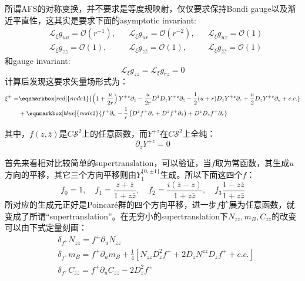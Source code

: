 所谓AFS的对称变换，并不要求是等度规映射，仅仅要求保持Bondi gauge以及渐近平直性，这其实是要求下面的asymptotic invariant:
\begin{align*}
	&\mathcal{L}_\xi g_{uu}=\mathcal{O}(r^{-1}),&&\mathcal{L}_\xi g_{ur}=\mathcal{O}(r^{-2}),&&\mathcal{L}_\xi g_{uz}=\mathcal{O}(1)\\
	&\mathcal{L}_\xi g_{zz}=\mathcal{O}(1),&&\mathcal{L}_\xi g_{z\bar z}=\mathcal{O}(1),&&\mathcal{L}_\xi g_{\bar z \bar z}=\mathcal{O}(1)
\end{align*}
和gauge invariant:
\begin{equation}
	\mathcal{L}_\xi g_{zz}=\mathcal{L}_\xi g_{rz}=0
\end{equation}
计算后发现这要求矢量场形式为：
\begin{equation}
	\begin{aligned}
		\xi^+=&\eqnmarkbox[red]{node1}{\left(1+\frac{u}{2r}\right)Y^{+z}\partial_z-\frac{u}{2r}D^{\bar z}D_zY^{+z}\partial_{\bar z}-\frac{1}{2}(u+r)D_zY^{+z}\partial_r+\frac{u}{2}D_zY^{+z}\partial_u+c.c.}\\
		&+\eqnmarkbox[blue]{node2}{f^+\partial_u-\frac{1}{r}\left(D^zf^+\partial_z+D^{\bar z}f^+\partial_{\bar z}\right)+D^zD_zf^+\partial_r}
	\end{aligned}
\end{equation}

\noindent 其中，$f(z,\bar z)$是$C\mathcal{S}^2$上的任意函数，而$Y^{+z}$在$C\mathcal{S}^2$上全纯：
\begin{equation}\label{Y}
	\partial_{\bar z}Y^{+z}=0
\end{equation}

首先来看相对比较简单的supertranslation，可以验证，当$f$取为常函数，其生成$u$方向的平移，其它三个方向平移则由$Y_1^{\{0,\pm1\}}$生成。所以下面这四个$f$：
\begin{equation}\label{f}
	f_0=1,\quad f_1=\frac{z+\bar z}{1+z\bar z},\quad f_2=\frac{i\left(\bar z-z\right)}{1+z\bar z},\quad f_3\frac{1-z\bar z}{1+z\bar z}
\end{equation}
所对应的生成元正好是Poincar\'e群的四个方向平移，进一步$f$扩展为任意函数，就变成了所谓“supertranslation”。在无穷小的supertranslation下$N_{zz},m_B,C_{zz}$的改变可以由下式定量刻画：
\begin{equation}
	\begin{aligned}
		&\delta_{f^+}N_{zz}=f^+\partial_u N_{zz}\\
		&\delta_{f^+} m_B=f^+\partial_u m_B+\frac{1}{4}\left[N_{zz}D_z^2f^++2D_zN^{zz}D_zf^++c.c.\right]\\
		&\delta_{f^+} C_{zz}=f^+\partial_u C_{zz}-2D_z^2f^+
	\end{aligned}
\end{equation}

